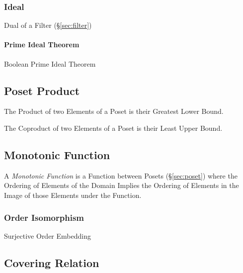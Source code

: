 \subsubsection{Ideal}\label{sec:order_ideal}

Dual of a Filter (\S\ref{sec:filter})



\paragraph{Prime Ideal Theorem}\label{sec:prime_ideal}

Boolean Prime Ideal Theorem



\subsection{Poset Product}\label{sec:poset_product}

The Product of two Elements of a Poset is their Greatest Lower Bound.

The Coproduct of two Elements of a Poset is their Least Upper Bound.



\subsection{Monotonic Function}\label{sec:monotonic_function}

A \emph{Monotonic Function} is a Function between Posets
(\S\ref{sec:poset}) where the Ordering of Elements of the Domain
Implies the Ordering of Elements in the Image of those Elements under
the Function.



\subsubsection{Order Isomorphism}\label{sec:order_isomorphism}

Surjective Order Embedding



\subsection{Covering Relation}\label{sec:covering_relation}

